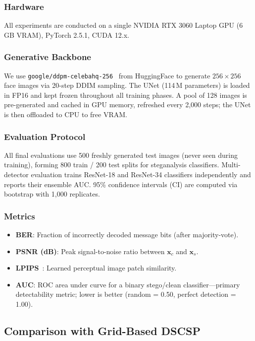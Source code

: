 \documentclass[journal]{IEEEtran}
\begin{document}
\subsubsection{Hardware}
All experiments are conducted on a single NVIDIA RTX 3060 Laptop GPU (6\,GB VRAM),
PyTorch 2.5.1, CUDA 12.x.

\subsubsection{Generative Backbone}
We use \texttt{google/ddpm-celebahq-256}~\cite{ho2020denoising} from HuggingFace to generate
$256\times256$ face images via 20-step DDIM sampling.
The UNet (114\,M parameters) is loaded in FP16 and kept frozen throughout all training phases.
A pool of 128 images is pre-generated and cached in GPU memory, refreshed every 2{,}000 steps;
the UNet is then offloaded to CPU to free VRAM.

\subsubsection{Evaluation Protocol}
All final evaluations use 500 freshly generated test images (never seen during training),
forming 800 train / 200 test splits for steganalysis classifiers.
Multi-detector evaluation trains ResNet-18 and ResNet-34 classifiers independently and
reports their ensemble AUC.
95\% confidence intervals (CI) are computed via bootstrap with 1{,}000 replicates.

\subsubsection{Metrics}
\begin{itemize}[itemsep=1pt,topsep=2pt]
    \item \textbf{BER}: Fraction of incorrectly decoded message bits (after majority-vote).
    \item \textbf{PSNR (dB)}: Peak signal-to-noise ratio between $\mathbf{x}_c$ and $\mathbf{x}_s$.
    \item \textbf{LPIPS}~\cite{zhang2018unreasonable}: Learned perceptual image patch similarity.
    \item \textbf{AUC}: ROC area under curve for a binary stego/clean classifier---primary
          detectability metric; lower is better (random = 0.50, perfect detection = 1.00).
\end{itemize}

\subsection{Comparison with Grid-Based DSCSP}
\label{sec:main_results}
\end{document}
